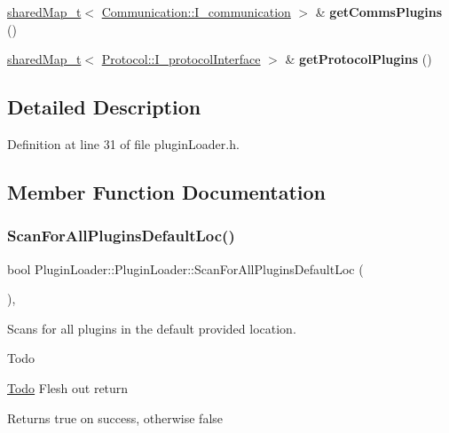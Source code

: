 \begin{DoxyCompactItemize}
\mbox{\hyperlink{namespacePluginLoader_a8e505caea20d9f45155939545d29f6ba}{shared\+Map\+\_\+t}}$<$ \mbox{\hyperlink{classCommunication_1_1I__communication}{Communication\+::\+I\+\_\+communication}} $>$ \& {\bfseries get\+Comms\+Plugins} ()
\item 
\mbox{\label{classPluginLoader_1_1PluginLoader_a0898468d5ab3c358ef8d18287de65036}} 
\mbox{\hyperlink{namespacePluginLoader_a8e505caea20d9f45155939545d29f6ba}{shared\+Map\+\_\+t}}$<$ \mbox{\hyperlink{classProtocol_1_1I__protocolInterface}{Protocol\+::\+I\+\_\+protocol\+Interface}} $>$ \& {\bfseries get\+Protocol\+Plugins} ()
\end{DoxyCompactItemize}


\subsection{Detailed Description}


Definition at line 31 of file plugin\+Loader.\+h.



\subsection{Member Function Documentation}
\mbox{\label{classPluginLoader_1_1PluginLoader_ad8d58265abe6e32b168651f47e3022ba}} 
\subsubsection{\texorpdfstring{ScanForAllPluginsDefaultLoc()}{ScanForAllPluginsDefaultLoc()}}
{\footnotesize\ttfamily bool Plugin\+Loader\+::\+Plugin\+Loader\+::\+Scan\+For\+All\+Plugins\+Default\+Loc (\begin{DoxyParamCaption}{ }\end{DoxyParamCaption})\hspace{0.3cm}{\ttfamily [override]}, {\ttfamily [virtual]}}



Scans for all plugins in the default provided location. 

\begin{DoxyRefDesc}{Todo}
\item[\mbox{\hyperlink{todo__todo000019}{Todo}}]Flesh out return \end{DoxyRefDesc}
\begin{DoxyReturn}{Returns}
true on success, otherwise false 
\end{DoxyReturn}


